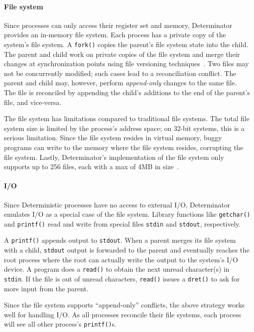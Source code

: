 \paragraph{File system}
Since processes can only access their register set and memory, Determinator
provides an in-memory file system. Each process has a private copy of the
system's file system. A {\tt fork()} copies the parent's file system state into
the child. The parent and child work on private copies of the file system and
merge their changes at synchronization points using file versioning
techniques~\cite{parker1983detection}. Two files may not be
concurrently modified; such cases lead to a reconciliation conflict. The parent
and child may, however, perform \emph{append-only} changes to the same file.
The file is reconciled by appending the child's additions to the end of the
parent's file, and vice-versa.

The file system has limitations compared to traditional file systems.
The total file system size is limited
by the process's address space; on 32-bit systems, this is a serious limitation.
Since the file system resides in virtual memory, buggy programs can write to
the memory where the file system resides, corrupting the file system. Lastly,
Determinator's implementation of the file system only supports up to 256 files,
each with a max of 4MB in size~\cite{Aviram10cloud}.

\paragraph{I/O}
Since Deterministic processes have no access to external I/O, Determinator
emulates I/O as a special case of the file system. Library functions like
{\tt getchar()} and {\tt printf()} read and write from special files
{\tt stdin} and {\tt stdout}, respectively.

A {\tt printf()} appends output to {\tt stdout}. When a parent merges its
file system with a child, {\tt stdout} output is forwarded
to the parent and eventually reaches the root process where the root can
actually write the output to the system's I/O device.
A program does a {\tt read()} to obtain the next unread character(s) in
{\tt stdin}. If the file is out of unread characters, {\tt read()} issues a
{\tt dret()} to ask for more input from the parent.

Since the file system supports ``append-only'' conflicts, the above strategy
works well for handling I/O. As all processes reconcile their file
systems, each process will see all other process's {\tt printf()}s.

